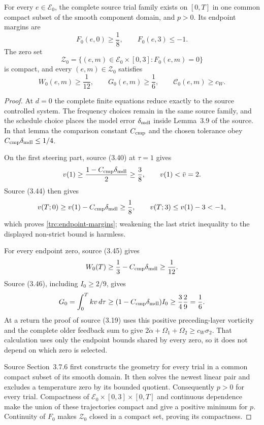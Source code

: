 \begin{lemma}\label{trc:source-margins}
For every $e\in\mathcal E_0$, the complete source trial family exists on
$[0,T]$ in one common compact subset of the smooth component domain, and
$p>0$.  Its endpoint margins are
\begin{equation}\label{trc:endpoint-margins}
 F_0(e,0)\geq\frac18,
 \qquad F_0(e,3)\leq-1.
\end{equation}
The zero set
\[
 \mathcal Z_0=\{(e,m)\in\mathcal E_0\times[0,3]:F_0(e,m)=0\}
\]
is compact, and every $(e,m)\in\mathcal Z_0$ satisfies
\begin{equation}\label{trc:root-margins}
 W_0(e,m)\geq\frac1{12},\qquad
 G_0(e,m)\geq\frac16,
 \qquad \mathcal C_0(e,m)\geq c_W.
\end{equation}
\end{lemma}

\begin{proof}
At $d=0$ the complete finite equations reduce exactly to the source
controlled system.  The frequency choices remain in the same source
family, and the schedule choice places the model error
$\delta_{\rm mdl}$ inside Lemma~3.9 of the source.  In that lemma the
comparison constant $C_{\rm cmp}$ and the chosen tolerance obey
$C_{\rm cmp}\delta_{\rm mdl}\leq1/4$.

On the first steering part, source (3.40) at $\tau=1$ gives
\[
 v(1)\geq\frac{1-C_{\rm cmp}\delta_{\rm mdl}}2\geq\frac38,
 \qquad v(1)<\bar v=2.
\]
Source (3.44) then gives
\[
 v(T;0)\geq v(1)-C_{\rm cmp}\delta_{\rm mdl}\geq\frac18,
 \qquad
 v(T;3)\leq v(1)-3<-1,
\]
which proves \eqref{trc:endpoint-margins}; weakening the last strict
inequality to the displayed non-strict bound is harmless.

For every endpoint zero, source (3.45) gives
\[
 W_0(T)\geq\frac13-C_{\rm cmp}\delta_{\rm mdl}\geq\frac1{12}.
\]
Source (3.46), including $I_0\geq2/9$, gives
\[
 G_0=\int_0^Tkv\,d\tau
 \geq(1-C_{\rm cmp}\delta_{\rm mdl})I_0
 \geq\frac34\frac29=\frac16.
\]
At a return the proof of source (3.19) uses this positive preceding-layer
vorticity and the complete older feedback sum to give
$2\dot\alpha+\Omega_1+\Omega_2\geq c_W\sigma_2$.
That calculation uses only the endpoint bounds shared by every zero, so it
does not depend on which zero is selected.

Source Section~3.7.6 first constructs the geometry for every trial in a
common compact subset of its smooth domain.  It then solves the newest
linear pair and excludes a temperature zero by its bounded quotient.
Consequently $p>0$ for every trial.  Compactness of
$\mathcal E_0\times[0,3]\times[0,T]$ and continuous dependence make the
union of these trajectories compact and give a positive minimum for $p$.
Continuity of $F_0$ makes $\mathcal Z_0$ closed in a compact set, proving
its compactness.
\end{proof}

